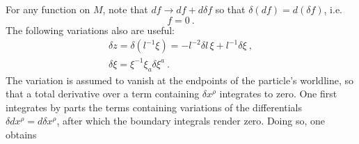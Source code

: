 \documentclass[11pt]{article}
\begin{document}
For any function on $M$, note that $df \to df + d\delta f$ so 
that $\delta (df) = d(\delta f)$, i.e.
\begin{equation}
	[\delta,d] f = 0~.
\end{equation}
The following variations also are useful:
\begin{gather}
	\delta z = \delta (l^{-1} \xi) = - l^{-2} \delta l\, \xi + 
	l^{-1} \delta\xi~, \\
	\delta \xi = \xi^{-1} \xi_a \delta \xi^a~.
\end{gather}
The variation is assumed to vanish at the endpoints of the 
particle's worldline, so that a total derivative over a term 
containing $\delta x^\rho$ integrates to zero. One first 
integrates by parts the terms containing variations of the 
differentials $\delta dx^\rho = d\delta x^\rho$, after which the 
boundary integrals render zero. Doing so, one obtains
\end{document}
